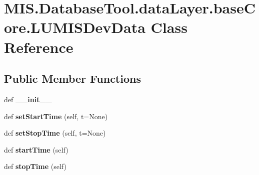 \hypertarget{classMIS_1_1DatabaseTool_1_1dataLayer_1_1baseCore_1_1LUMISDevData}{}\section{M\+I\+S.\+Database\+Tool.\+data\+Layer.\+base\+Core.\+L\+U\+M\+I\+S\+Dev\+Data Class Reference}
\label{classMIS_1_1DatabaseTool_1_1dataLayer_1_1baseCore_1_1LUMISDevData}
\subsection*{Public Member Functions}
\begin{DoxyCompactItemize}
\item 
\mbox{\label{classMIS_1_1DatabaseTool_1_1dataLayer_1_1baseCore_1_1LUMISDevData_abed98e4bdcdda675f1262e511f620bb7}} 
def {\bfseries \+\_\+\+\_\+init\+\_\+\+\_\+}
\item 
\mbox{\label{classMIS_1_1DatabaseTool_1_1dataLayer_1_1baseCore_1_1LUMISDevData_a2a41f787eb63f7cdfcce8505726dcf5c}} 
def {\bfseries set\+Start\+Time} (self, t=None)
\item 
\mbox{\label{classMIS_1_1DatabaseTool_1_1dataLayer_1_1baseCore_1_1LUMISDevData_ac18d5b71382bcbefabc252342c4a0bab}} 
def {\bfseries set\+Stop\+Time} (self, t=None)
\item 
\mbox{\label{classMIS_1_1DatabaseTool_1_1dataLayer_1_1baseCore_1_1LUMISDevData_aa6020a182e9b792e3d2dcd7bce0cb168}} 
def {\bfseries start\+Time} (self)
\item 
\mbox{\label{classMIS_1_1DatabaseTool_1_1dataLayer_1_1baseCore_1_1LUMISDevData_a89d08c30987bb6425c79a86ee1c3f37a}} 
def {\bfseries stop\+Time} (self)
\item 
\mbox{\label{classMIS_1_1DatabaseTool_1_1dataLayer_1_1baseCore_1_1LUMISDevData_a8125adcfe76739a41c522cfe7c7d424e}} 

\end{DoxyCompactItemize}
